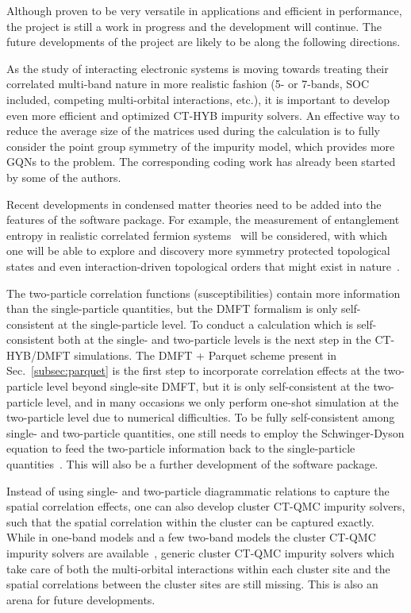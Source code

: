 Although proven to be very versatile in applications and efficient in performance, the {\iqist} project is still a work in progress and the development will continue. The future developments of the {\iqist} project are likely to be along the following directions.

As the study of interacting electronic systems is moving towards treating their correlated multi-band nature in more realistic fashion (5- or 7-bands, SOC included, competing multi-orbital interactions, etc.), it is important to develop even more efficient and optimized CT-HYB impurity solvers. An effective way to reduce the average size of the matrices used during the calculation is to fully consider the point group symmetry of the impurity model, which provides more GQNs to the problem. The corresponding coding work has already been started by some of the authors.

Recent developments in condensed matter theories need to be added into the features of the {\iqist} software package. For example, the measurement of entanglement entropy in realistic correlated fermion systems~\cite{PhysRevLett.111.130402,PhysRevB.89.125121} will be considered, with which one will be able to explore and discovery more symmetry protected topological states and even interaction-driven topological orders that might exist in nature~\cite{Chen21122012,Wang07022014}. 

The two-particle correlation functions (susceptibilities) contain more information than the single-particle quantities, but the DMFT formalism is only self-consistent at the single-particle level. To conduct a calculation which is self-consistent both at the single- and two-particle levels is the next step in the CT-HYB/DMFT simulations. The DMFT + Parquet scheme present in Sec.~\ref{subsec:parquet} is the first step to incorporate correlation effects at the two-particle level beyond single-site DMFT, but it is only self-consistent at the two-particle level, and in many occasions we only perform one-shot simulation at the two-particle level due to numerical difficulties. To be fully self-consistent among single- and two-particle quantities, one still needs to employ the Schwinger-Dyson equation to feed the two-particle information back to the single-particle quantities~\cite{PhysRevE.80.046706,PhysRevE.87.013311}. This will also be a further development of the {\iqist} software package.

Instead of using single- and two-particle diagrammatic relations to capture the spatial correlation effects, one can also develop cluster CT-QMC impurity solvers, such that the spatial correlation within the cluster can be captured exactly. While in one-band models and a few two-band models the cluster CT-QMC impurity solvers are available~\cite{RevModPhys.77.1027,RevModPhys.78.865,PhysRevB.88.041103,PhysRevB.88.245110,PhysRevB.89.195146}, generic cluster CT-QMC impurity solvers which take care of both the multi-orbital interactions within each cluster site and the spatial correlations between the cluster sites are still missing. This is also an arena for future developments.

